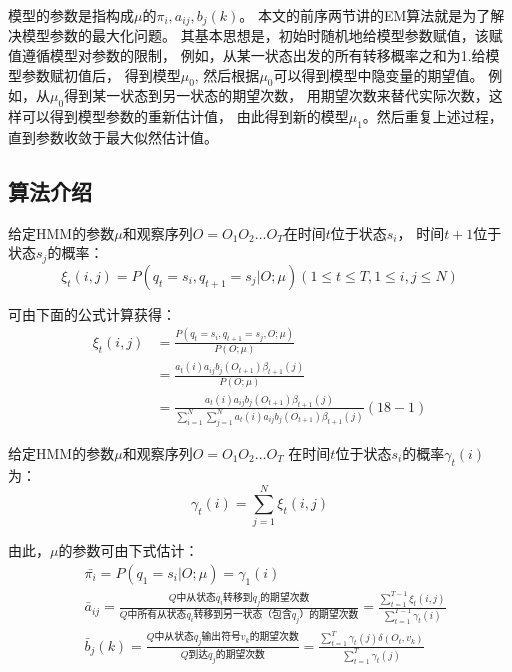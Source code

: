 \documentclass[a4paper,12pt]{book}
\begin{document}
    模型的参数是指构成$\mu$的$\pi_i,a_{ij}, b_j(k)$。
    本文的前序两节讲的EM算法就是为了解决模型参数的最大化问题。
    其基本思想是，初始时随机地给模型参数赋值，该赋值遵循模型对参数的限制，
    例如，从某一状态出发的所有转移概率之和为1.给模型参数赋初值后，
    得到模型$\mu_0$, 然后根据$\mu_0$可以得到模型中隐变量的期望值。
    例如，从$\mu_0$得到某一状态到另一状态的期望次数，
    用期望次数来替代实际次数，这样可以得到模型参数的重新估计值，
    由此得到新的模型$\mu_1$。然后重复上述过程，直到参数收敛于最大似然估计值。

    \subsection{算法介绍}
    给定HMM的参数$\mu$和观察序列$O=O_1O_2\dots O_T$在时间$t$位于状态$s_i$，
    时间$t+1$位于状态$s_j$的概率：
    \begin{equation}
        \xi_t(i,j) = P(q_t=s_i, q_{t+1} = s_j | O; \mu)(1 \le t \le T, 1 \le i,j \le N)
    \end{equation}

    可由下面的公式计算获得：
    \begin{equation}
        \begin{split}
            \xi_t(i,j) &= \frac{P(q_t=s_i, q_{t+1} = s_j , O; \mu)}{P(O;\mu)} \\
            &=\frac{a_t(i)a_{ij}b_j(O_{t+1})\beta_{t+1}(j)}{P(O;\mu)}\\
            &=\frac{a_t(i)a_{ij}b_j(O_{t+1})\beta_{t+1}(j)}{\sum_{i=1}^N\sum_{j=1}^Na_t(i)a_{ij}b_j(O_{t+1})\beta_{t+1}(j)}(18-1)
        \end{split}
    \end{equation}

    给定HMM的参数$\mu$和观察序列$O=O_1O_2\dots O_T$
    在时间$t$位于状态$s_i$的概率$\gamma_t(i)$为：
    \begin{equation}
        \gamma_t(i) = \sum_{j=1}^N \xi_t(i,j)
    \end{equation}
 
    由此，$\mu$的参数可由下式估计：
    \begin{equation}
        \begin{split}
            &\bar{\pi_i} = P(q_1=s_i |O; \mu) = \gamma_1(i)\\
            &\bar{a}_{ij}= \frac{Q\mbox{中从状态}q_i\mbox{转移到}q_j\mbox{的期望次数}}{Q\mbox{中所有从状态}q_i\mbox{转移到另一状态（包含}q_j\mbox{）的期望次数}}=\frac{\sum_{t=1}^{T-1}\xi_t(i,j) }{\sum_{t=1}^{T-1}\gamma_t(i)}\\
            &\bar{b}_j(k) = \frac{Q\mbox{中从状态}q_j\mbox{输出符号}v_k\mbox{的期望次数}}{Q\mbox{到达}q_j\mbox{的期望次数}}=\frac{\sum_{t=1}^{T}\gamma_t(j)\delta(O_t, v_k)}{\sum_{t=1}^{T}\gamma_t(j)}
        \end{split}
    \end{equation}
\end{document}

